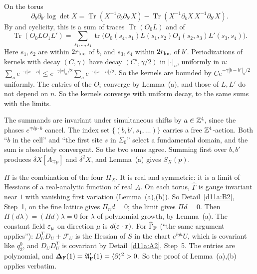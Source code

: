 \begin{detail}\label{d11a:F6}
\begin{step}
On the torus
\[
\partial_b\partial_{b'}\log\det X=\operatorname{Tr}(X^{-1}\partial_b\partial_{b'}X)-\operatorname{Tr}(X^{-1}\partial_bX\,X^{-1}\partial_{b'}X).
\]
By  and cyclicity, this is a sum of traces $\operatorname{Tr}(O_0L)$ and of
\[
\operatorname{Tr}(O_0LO_1L')=\sum_{s_1,\dots,s_4}\operatorname{tr}\big(O_0(s_4,s_1)L(s_1,s_2)O_1(s_2,s_3)L'(s_3,s_4)\big).
\] Here $s_1,s_2$ are within $2r_{\rm loc}$ of $b$, and $s_3,s_4$ within $2r_{\rm loc}$ of $b'$. Periodizations of kernels with decay $(C,\gamma)$ have decay $(C',\gamma/2)$ in $|\cdot|_n$, uniformly in $n$: $\sum_ae^{-\gamma|x-a|}\le e^{-\gamma|x|_n/2}\sum_ae^{-\gamma|x-a|/2}$. So the kernels are bounded by $Ce^{-\gamma|b-b'|_n/2}$ uniformly. The entries of the $O_i$ converge by Lemma~(a), and those of $L,L'$ do not depend on $n$. So the kernels converge with uniform decay, to the same sums with the limits.
\end{step}
\begin{step}
The summands are invariant under simultaneous shifts by $a\in\mathbb Z^4$, since the phases $e^{\mp\ii p\cdot b}$ cancel. The index set $\{(b,b',s_1,\ldots)\}$ carries a free $\mathbb Z^4$-action. Both ``$b$ in the cell'' and ``the first site $s$ in $\Sigma_0$'' select a fundamental domain, and the sum is absolutely convergent. So the two sums agree. Summing first over $b,b'$ produces $\delta X[A_{\mp p}]$ and $\delta^2X$, and Lemma~(a) gives $S_X(p)$.
\end{step}
\begin{step}[(b)]
$\Pi$ is the combination of the four $\Pi_X$. It is real and symmetric: it is a limit of Hessians of a real-analytic function of real $A$. On each torus, $\widehat\Gamma$ is gauge invariant near $1$ with vanishing first variation (Lemma~(a),(b)). So Detail~\ref{d11a:B2}, Step~1, on the fine lattice gives $\Pi_nd=0$; the limit gives $\Pi d=0$. Then $\Pi(d\lambda)=(\Pi d)\lambda=0$ for $\lambda$ of polynomial growth, by Lemma~(a). The constant field $\varepsilon_\mu$ on direction $\mu$ is $d(\varepsilon\cdot x)$. For $\widehat\Gamma_{\rm F}$ (``the same argument applies''): $D_U^TD_U+\mathcal F_U$ is the Hessian of $S$ in the chart $e^{\ii\eta h}U$, which is covariant like $q_2^0$, and $D_UD_U^T$ is covariant by Detail~\ref{d11a:A2}, Step~5. The entries are polynomial, and $\boldsymbol{\Delta}_{\rm F}(1)=\mathfrak A'_{\rm F}(1)=\langle\partial\rangle^2>0$. So the proof of Lemma~(a),(b) applies verbatim.

\end{step}
\end{detail}
